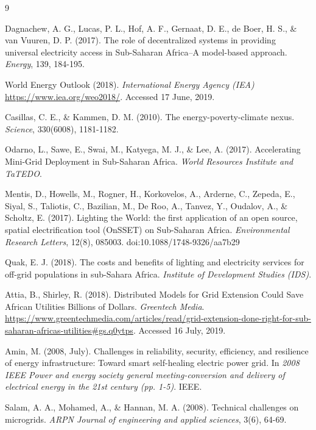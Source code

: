\documentclass[final,3p,times]{elsarticle}
\begin{document}
\begin{thebibliography}{9}

Dagnachew, A. G., Lucas, P. L., Hof, A. F., Gernaat, D. E., de Boer, H. S., \& van Vuuren, D. P. (2017). The role of decentralized systems in providing universal electricity access in Sub-Saharan Africa–A model-based approach. \textit{Energy}, 139, 184-195.

World Energy Outlook (2018). \textit{International Energy Agency (IEA)}
\url{https://www.iea.org/weo2018/}. Accessed 17 June, 2019.  

Casillas, C. E., \& Kammen, D. M. (2010). The energy-poverty-climate nexus. \textit{Science}, 330(6008), 1181-1182.

Odarno, L., Sawe, E., Swai, M., Katyega, M. J., \& Lee, A. (2017). Accelerating Mini-Grid Deployment in Sub-Saharan Africa. \textit{World Resources Institute and TaTEDO}. 

Mentis, D., Howells, M., Rogner, H., Korkovelos, A., Arderne, C., Zepeda, E., Siyal, S., Taliotis, C., Bazilian, M., De Roo, A., Tanvez, Y., Oudalov, A., \& Scholtz, E. (2017). Lighting the World: the first application of an open source, spatial electrification tool (OnSSET) on Sub-Saharan Africa. \textit{Environmental Research Letters}, 12(8), 085003. doi:10.1088/1748-9326/aa7b29

Quak, E. J. (2018). The costs and benefits of lighting and electricity services for off-grid populations in sub-Sahara Africa. \textit{Institute of Development Studies (IDS)}.

Attia, B., Shirley, R. (2018). Distributed Models for Grid Extension Could Save African Utilities Billions of Dollars. \textit{Greentech Media}. \url{https://www.greentechmedia.com/articles/read/grid-extension-done-right-for-sub-saharan-africas-utilities#gs.q0ytps}. Accessed 16 July, 2019. 

Amin, M. (2008, July). Challenges in reliability, security, efficiency, and resilience of energy infrastructure: Toward smart self-healing electric power grid. In \textit{2008 IEEE Power and energy society general meeting-conversion and delivery of electrical energy in the 21st century (pp. 1-5)}. IEEE.

Salam, A. A., Mohamed, A., \& Hannan, M. A. (2008). Technical challenges on microgrids. \textit{ARPN Journal of engineering and applied sciences}, 3(6), 64-69.


\end{thebibliography}
\end{document}
